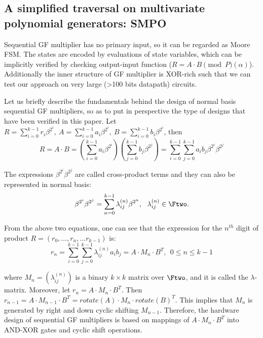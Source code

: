 \subsection{A simplified traversal on multivariate polynomial generators: SMPO}
Sequential GF multiplier has no primary input, so it can be regarded as Moore FSM. 
The states are encoded by evaluations of state variables, which can be implicitly verified 
by checking output-input function ($R = A\cdot B \pmod P(\alpha)$). Additionally
the inner structure of GF multiplier is XOR-rich such that we can test our approach on very large
(>100 bits datapath) circuits.

Let us briefly describe the fundamentals behind the design of normal
basis sequential GF multipliers, so as to put in perspective the type
of designs that have been verified in this paper. Let $R =
\sum_{i=0}^{k-1} r_i \beta^{2^{i}}, ~A = \sum_{i=0}^{k-1} a_i
\beta^{2^{i}}, ~B = \sum_{i=0}^{k-1} b_i \beta^{2^{i}}$, then 
\[
R = A\cdot B = (\sum_{i=0}^{k-1} a_i \beta^{2^{i}}) (\sum_{j=0}^{k-1}
b_j \beta^{2^{j}})  =
\sum_{i=0}^{k-1}\sum_{j=0}^{k-1}a_ib_j\beta^{2^i}\beta^{2^j}\nonumber 
\]

The expressions $\beta^{2^i}\beta^{2^j}$ are called cross-product
terms and they can also be represented in normal basis: 
\begin{displaymath}
\beta^{2^i}\beta^{2^j} =
\sum_{n=0}^{k-1}\lambda_{ij}^{(n)}\beta^{2^n}, \ \ \lambda_{ij}^{(n)}
\in \Ftwo. 
\end{displaymath}

From the above two equations, one can see that the expression for the
$n^{th}$ digit of product $R = (r_0, \dots, r_n, \dots r_{k-1})$ is:
\[
r_n = \sum_{i=0}^{k-1}\sum_{j=0}^{k-1}\lambda_{ij}^{(n)}a_ib_j = A
\cdot M_n \cdot B^T, ~~0 \leq n \leq k-1
\]

where $M_n = (\lambda_{ij}^{(n)})$ is a binary $k \times k$ matrix over
$\Ftwo$, and it is called the $\lambda$-matrix. 
Moreover, let $r_n = A \cdot M_n \cdot B^T$.
Then $r_{n-1} = A \cdot M_{n-1} \cdot B^T = rotate(A) \cdot M_n
\cdot rotate(B)^T$. This implies that $M_n$ is generated by right
and down cyclic shifting $M_{n-1}$. Therefore, the hardware design
of sequential GF multipliers is based on mappings of $A\cdot M_n
\cdot B^T$ into AND-XOR gates and cyclic shift operations. 

